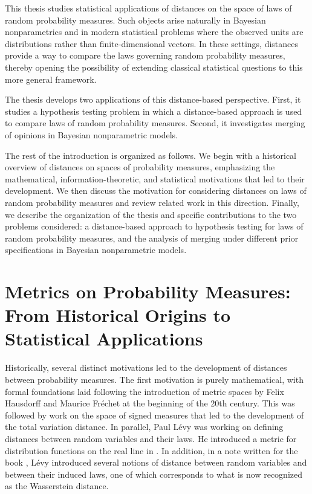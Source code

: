 
This thesis studies statistical applications of distances on the space of laws of random probability measures. Such objects arise naturally in Bayesian nonparametrics and in modern statistical problems where the observed units are distributions rather than finite-dimensional vectors. In these settings, distances provide a way to compare the laws governing random probability measures, thereby opening the possibility of extending classical statistical questions to this more general framework. 

The thesis develops two applications of this distance-based perspective. First, it studies a hypothesis testing problem in which a distance-based approach is used to compare laws of random probability measures. Second, it investigates merging of opinions in Bayesian nonparametric models.

The rest of the introduction is organized as follows. We begin with a historical overview of distances on spaces of probability measures, emphasizing the mathematical, information-theoretic, and statistical motivations that led to their development. We then discuss the motivation for considering distances on laws of random probability measures and review related work in this direction. Finally, we describe the organization of the thesis and specific contributions to the two problems considered: a distance-based approach to hypothesis testing for laws of random probability measures, and the analysis of merging under different prior specifications in Bayesian nonparametric models.

\section{Metrics on Probability Measures: From Historical Origins to Statistical Applications}\label{section:general_intro_metrics_on_probabilities}

Historically, several distinct motivations led to the development of distances between probability measures. The first motivation is purely mathematical, with formal foundations laid following the introduction of metric spaces by Felix Hausdorff and Maurice Fr\'echet at the beginning of the 20th century. This was followed by work on the space of signed measures that led to the development of the total variation distance. In parallel, Paul L\'evy was working on defining distances between random variables and their laws. He introduced a metric for distribution functions on the real line in \cite{levy1925calcul}. In addition, in a note written for the book \cite{frechet1950recherches}, L\'evy introduced several notions of distance between random variables and between their induced laws, one of which corresponds to what is now recognized as the Wasserstein distance.

